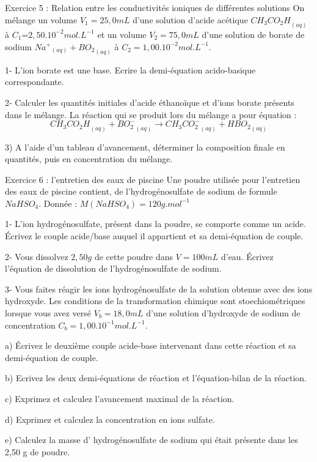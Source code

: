 \documentclass[12pt, french]{article}
\begin{document}

\begin{Box2}{Exercice 5 : Relation entre les conductivités ioniques de différentes solutions }
   On mélange un volume $V_1 = 25,0 mL$ d’une solution d’acide acétique ${CH_3CO_2H}_{(aq)}$ à $C_1$=$2,50.10^{-2} mol.L^{-1}$
et un volume $V_2 = 75,0 mL$ d’une solution de borate de sodium ${Na^+}_{ (aq)} + {BO_2}_{(aq)}$ à $C_2 = 1,00.10^{-2} mol.L^{-1}$.

1- L’ion borate est une base. Ecrire la demi-équation acido-basique correspondante.

2- Calculer les quantités initiales d’acide éthanoïque et d’ions borate présents dans le mélange.
   La réaction qui se produit lors du mélange a pour équation :$$ {CH_3CO_2H}_{(aq)} + {BO_2^-}_{(aq)} \rightarrow {CH_3CO_2^-}_(aq)+ {HBO_2}_{(aq)}$$

3) A l’aide d’un tableau d’avancement, déterminer la composition finale en quantités, puis en
concentration du mélange.
\end{Box2}


\begin{Box2}{Exercice 6 : l’entretien des eaux de piscine}
Une poudre utilisée pour l’entretien des eaux de piscine contient, de l’hydrogénosulfate de sodium de formule $NaHSO_4$. Donnée : $M(NaHSO_4) = 120 g.mol^{-1}$

1- L’ion hydrogénosulfate, présent dans la poudre, se comporte comme un acide. Écrivez le couple acide/base
auquel il appartient et sa demi-équation de couple.

   2- Vous dissolvez $2,50g$ de cette poudre dans $V=100mL$ d’eau. Écrivez l’équation de dissolution de
l’hydrogénosulfate de sodium.

   3- Vous faites réagir les ions hydrogénosulfate de la solution obtenue avec des ions hydroxyde. Les conditions
de la transformation chimique sont stoechiométriques lorsque vous avez versé $V_b = 18,0mL$ d’une solution
d’hydroxyde de sodium de concentration $C_b =1,00.10^{-1} mol.L^{-1}$.

a) Écrivez le deuxième couple acide-base intervenant dans cette réaction et sa demi-équation de couple.

   b) Ecrivez les deux demi-équations de réaction et l’équation-bilan de la réaction.

   c) Exprimez et calculez l’avancement maximal de la réaction.

   d) Exprimez et calculez la concentration en ions sulfate.

   e) Calculez la masse d’ hydrogénosulfate de sodium qui était présente dans les 2,50 g de poudre.
\end{Box2}
\end{document}
